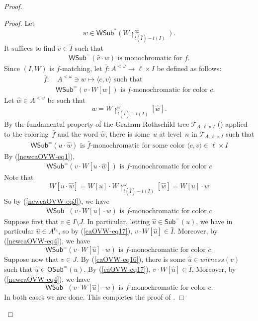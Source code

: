 \documentclass[10pt,a4paper]{amsart}
\def\T{\mathcal{T}}
\def\h{\hat}
\def\uhr{\upharpoonright}
\def\wsamelong{\mathsf{WSub}^{=}}
\def\wshorter{\mathsf{WSub}^{*}}
\newcommand{\OSub}{\mathsf{OSub}}
\newcommand{\SubW}{\mathsf{Sub}}
\newcommand{\WSub}{\mathsf{WSub}}
\begin{document}
\begin{proof}
\begin{proof}
Let $$w\in \wshorter(W\uhr_{t(\h I)-t(I)}^\infty).$$
It suffices to find $\h v\in \h I$ such that
\begin{align}\label{caOVW-eq20}
\wsamelong(\h v\cdot w)\text{ is monochromatic for $f$.}
\end{align}
Since $(I, W)$ is $f$-matching, let $\bar f : A^{<\omega} \to \ell \times I$ be defined as follows:
\begin{align}\label{newcaOVW-eq1}
\bar f: &\ A^{<\omega}\ni w \mapsto \langle c, v\rangle
\text{ such that }\\ \nonumber
&\text{$\wsamelong(v\cdot W[w])$ is $f$-monochromatic for color~$c$}.
\end{align}
Let $\hat w \in A^{<\omega}$ be such that
$$w = W\uhr_{t(\h I)-t(I)}^\omega[\hat w].$$
By the fundamental property of the Graham-Rothschild tree $\T_{A,\ell \times I}$ () applied to the coloring~$\bar f$ and the word $\hat w$, there is some~$u$ at level~$n$ in $\T_{A,\ell \times I}$ such that
\begin{align}\label{newcaOVW-eq2}
\text{$\WSub^=( u \cdot \hat w)$ is $\bar f$-monochromatic for some color $\langle c, v\rangle \in \ell \times I$} 
\end{align}
By (\ref{newcaOVW-eq1}),
\begin{align}\label{newcaOVW-eq3}
\text{$\WSub^=(v \cdot W[u \cdot \hat w])$ is $f$-monochromatic for color~$c$} 
\end{align}
Note that
$$
W[u \cdot \hat w] = W[u] \cdot W\uhr_{t(\h I)-t(I)}^\omega[\hat w] = W[u] \cdot w
$$
So by (\ref{newcaOVW-eq3}), we have
\begin{align}\label{newcaOVW-eq4}
\text{$\WSub^=(v \cdot W[u] \cdot w)$ is $f$-monochromatic for color~$c$} 
\end{align}
Suppose first that $v \in I \setminus J$. In particular, letting $\hat u \in \SubW^=(u)$,
we have in particular $\hat u \in A^{t_n}$, so by (\ref{caOVW-eq17}), $v \cdot W[\hat u] \in \hat I$. Moreover, by (\ref{newcaOVW-eq4}), we have
$$
\text{$\WSub^=(v \cdot W[\hat u] \cdot w)$ is $f$-monochromatic for color~$c$.} 
$$
Suppose now that $v \in J$. By (\ref{caOVW-eq16}), there is some $\hat u \in witness(v)$ such that $\hat u \in \OSub^=(u)$. By (\ref{caOVW-eq17}), $v \cdot W[\hat u] \in \hat I$. Moreover, by (\ref{newcaOVW-eq4}), we have
$$
\text{$\WSub^=(v \cdot W[\hat u] \cdot w)$ is $f$-monochromatic for color~$c$.} 
$$
In both cases we are done. This completes the proof of .



\end{proof}
\end{proof}
\end{document}
